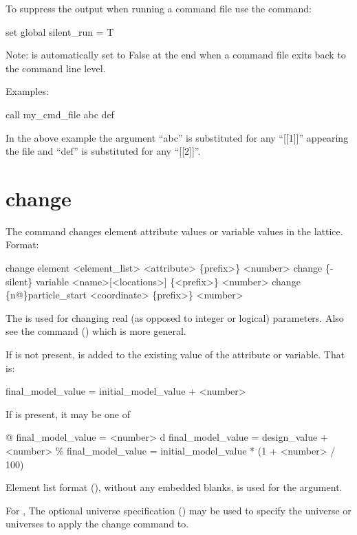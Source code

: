 To suppress the output when running a command file use the command:
\begin{example}
  set global silent_run = T
\end{example}
Note:  is automatically set to False at the end when a command file exits back to the
command line level.

Examples:
\begin{example}
    call my_cmd_file abc def 
\end{example}
In the above example the argument ``abc'' is substituted for any ``[[1]]'' appearing the
file and ``def'' is substituted for any ``[[2]]''.  \Newline

\section{change}
\label{s:change}

The  command changes element attribute values or variable values in the
 lattice. Format:
\begin{example}
  change element <element_list> <attribute> \{prefix>\} <number>
  change \{-silent\} variable <name>[<locations>] \{<prefix>\} <number>
  change  \{n@\}particle_start <coordinate> \{prefix>\} <number>
\end{example}

\vskip 10pt 

The  is used for changing real (as opposed to integer or logical)
parameters. Also see the  command () which is more general.

If  is not present,  is added to the existing value
of the attribute or variable. That is:
\begin{example}
  final_model_value = initial_model_value + <number>
\end{example}
If  is present, it may be one of
\begin{example}
  @       final_model_value = <number>
  d       final_model_value = design_value + <number>
  \%       final_model_value = initial_model_value * (1 + <number> / 100)
\end{example}

Element list format (), without any embedded blanks, is used for
the  argument.

For , The optional  universe specification
() may be used to specify the universe or universes to apply the change
command to.

